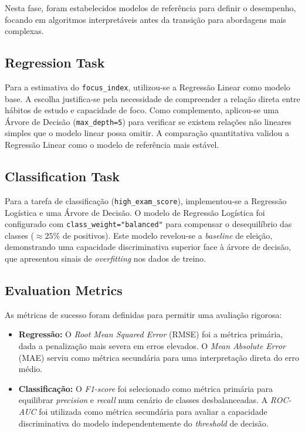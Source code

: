 
Nesta fase, foram estabelecidos modelos de referência para definir o desempenho, focando em algoritmos interpretáveis antes da transição para abordagens mais complexas.

\subsection{Regression Task}
Para a estimativa do \texttt{focus\_index}, utilizou-se a Regressão Linear como modelo base. A escolha justifica-se pela necessidade de compreender a relação direta entre hábitos de estudo e capacidade de foco. Como complemento, aplicou-se uma Árvore de Decisão (\texttt{max\_depth=5}) para verificar se existem relações não lineares simples que o modelo linear possa omitir. A comparação quantitativa validou a Regressão Linear como o modelo de referência mais estável.

\subsection{Classification Task}
Para a tarefa de classificação (\texttt{high\_exam\_score}), implementou-se a Regressão Logística e uma Árvore de Decisão. O modelo de Regressão Logística foi configurado com \texttt{class\_weight="balanced"} para compensar o desequilíbrio das classes ($\approx 25\%$ de positivos). Este modelo revelou-se a \textit{baseline} de eleição, demonstrando uma capacidade discriminativa superior face à árvore de decisão, que apresentou sinais de \textit{overfitting} nos dados de treino.

\subsection{Evaluation Metrics}
As métricas de sucesso foram definidas para permitir uma avaliação rigorosa:
\begin{itemize}
    \item \textbf{Regressão:} O \textit{Root Mean Squared Error} (RMSE) foi a métrica primária, dada a penalização mais severa em erros elevados. O \textit{Mean Absolute Error} (MAE) serviu como métrica secundária para uma interpretação direta do erro médio.
    \item \textbf{Classificação:} O \textit{F1-score} foi selecionado como métrica primária para equilibrar \textit{precision} e \textit{recall} num cenário de classes desbalanceadas. A \textit{ROC-AUC} foi utilizada como métrica secundária para avaliar a capacidade discriminativa do modelo independentemente do \textit{threshold} de decisão.
\end{itemize}